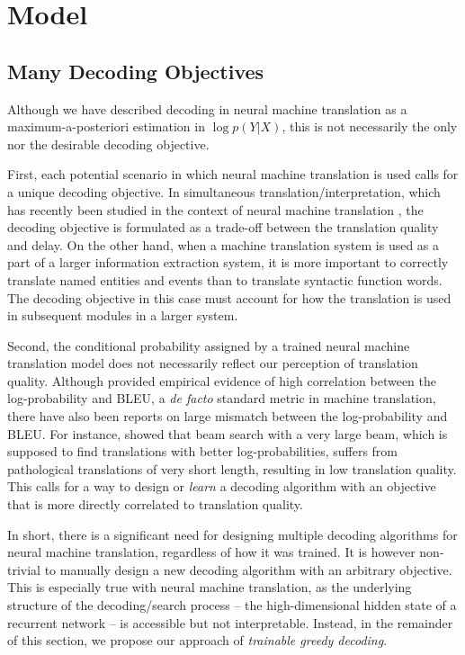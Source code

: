 \section{Model}

\subsection{Many Decoding Objectives}
Although we have described decoding in neural machine translation as a maximum-a-posteriori estimation in $\log p(Y|X)$, this is not necessarily the only %
nor the desirable decoding objective. 

First, each potential scenario in which neural machine translation is used calls for a unique decoding objective. In simultaneous translation/interpretation, which has recently been studied in the context of neural machine translation \citep{gu2016learning}, the decoding objective is formulated as a trade-off between the translation quality and delay. On the other hand, when a machine translation system is used as a part of a larger information extraction system, it is more important to correctly translate named entities and events than to translate syntactic function words. The decoding objective in this case must account for how the translation is used in subsequent modules in a larger system. 

Second, the conditional probability assigned by a trained neural machine translation model does not necessarily reflect our perception of translation quality. Although \citet{cho2016noisy} provided empirical evidence of high correlation between the log-probability and BLEU, a {\it de facto} standard metric in machine translation, there have also been reports on large mismatch between the log-probability and BLEU. For instance, \citet{tu2016neural} showed that beam search with a very large beam, which is supposed to find translations with better log-probabilities, suffers from pathological translations of very short length, resulting in low translation quality. This calls for a way to design or {\it learn} a decoding algorithm with an objective that is more directly correlated to translation quality. 

In short, there is a significant need for designing multiple decoding algorithms for neural machine translation, regardless of how it was trained. It is however non-trivial to manually design a new decoding algorithm with an arbitrary objective. This is especially true with neural machine translation, as the underlying structure of the decoding/search process -- the high-dimensional hidden state of a recurrent network -- is accessible but not interpretable. Instead, in the remainder of this section, we propose our approach of {\it trainable greedy decoding}.



